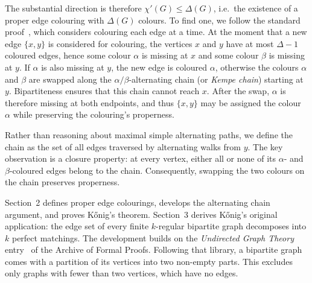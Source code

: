 \documentclass[11pt,a4paper]{article}
\begin{document}
The substantial direction is therefore $\chi'(G) \leq \Delta(G)$, i.e.\ the existence
of a proper edge colouring with $\Delta(G)$ colours. To find one, we follow the standard
proof~\cite[Proposition~5.3.1]{diestel}, which considers colouring each edge at a time.
At the moment that a new edge $\{x,y\}$ is considered for colouring, the vertices $x$
and $y$ have at most
$\Delta - 1$ coloured edges, hence some colour $\alpha$ is missing at $x$ and
some colour $\beta$ is missing at $y$. If $\alpha$ is also missing at $y$, the
new edge is coloured $\alpha$, otherwise the colours $\alpha$ and $\beta$ are swapped
along the $\alpha/\beta$-alternating chain (or \emph{Kempe chain}) starting
at $y$. Bipartiteness
ensures that this chain cannot reach $x$. After the swap, $\alpha$ is
therefore missing at both endpoints, and thus $\{x,y\}$ may be assigned the colour $\alpha$
while preserving the colouring's properness.

Rather than reasoning about maximal simple alternating paths, we define the
chain as the set of all edges traversed by alternating walks from $y$.
The key observation is a closure property: at every vertex, either all or
none of its $\alpha$- and $\beta$-coloured edges belong to the chain.
Consequently, swapping the two colours on the chain preserves properness.

Section~2 defines proper edge colourings, develops the
alternating chain argument, and proves K\H{o}nig's theorem.
Section~3 derives K\H{o}nig's original application:
the edge set of every finite $k$-regular bipartite graph decomposes into $k$
perfect matchings. The development builds on the \emph{Undirected Graph
Theory} entry~\cite{Undirected_Graph_Theory-AFP} of the Archive of Formal Proofs.
Following that library, a bipartite graph comes with a partition of its
vertices into two non-empty parts. This excludes only graphs with fewer than
two vertices, which have no edges.





\end{document}
